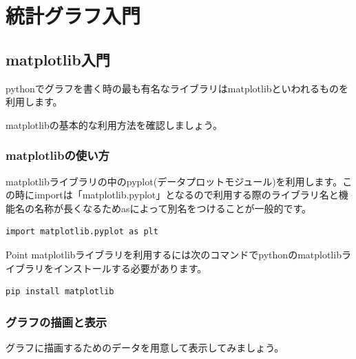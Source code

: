 \chapter{統計グラフ入門}


\section{matplotlib入門}
pythonでグラフを書く時の最も有名なライブラリはmatplotlibといわれるものを利用します。

matplotlibの基本的な利用方法を確認しましょう。

\subsection{matplotlibの使い方}
matplotlibライブラリの中のpyplot(データプロットモジュール)を利用します。この時にimportは「matplotlib.pyplot」となるので利用する際のライブラリ名と機能名の名称が長くなるためasによって別名をつけることが一般的です。

\begin{verbatim}
import matplotlib.pyplot as plt

\end{verbatim}

\begin{hipoint}{Point}
matplotlibライブラリを利用するには次のコマンドでpythonのmatplotlibライブラリをインストールする必要があります。
\begin{verbatim}
pip install matplotlib
\end{verbatim}
\end{hipoint}
\subsection{グラフの描画と表示}
グラフに描画するためのデータを用意して表示してみましょう。

